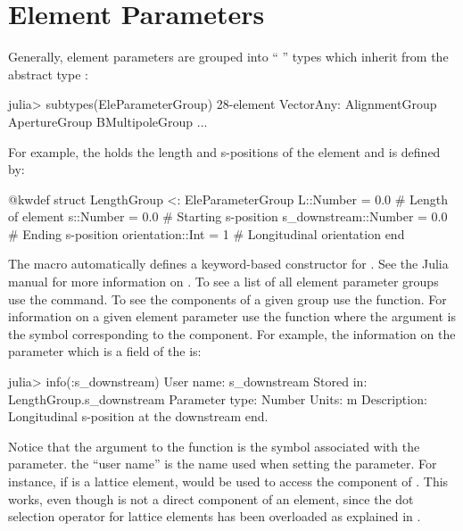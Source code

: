 \section{Element Parameters}
\label{s:ele.type}

Generally, element parameters are grouped into ``  '' 
types which inherit from the abstract type :
\begin{example}
  julia> subtypes(EleParameterGroup)
  28-element Vector{Any}:
   AlignmentGroup
   ApertureGroup
   BMultipoleGroup
   ...
\end{example}

For example, the  holds the length and s-positions of the element and is defined by:
\begin{example}
  @kwdef struct LengthGroup <: EleParameterGroup
    L::Number = 0.0               # Length of element
    s::Number = 0.0               # Starting s-position
    s_downstream::Number = 0.0    # Ending s-position
    orientation::Int = 1          # Longitudinal orientation
  end
\end{example}
The  macro automatically defines a keyword-based constructor for .
See the Julia manual for more information on . 
To see a list of all element parameter groups use the  command.
To see the components of a given group use the  function. For information on
a given element parameter use the  function where the argument is the
symbol corresponding to the component. For example, the information on
the  parameter which is a field of the  is:
\begin{example}
  julia> info(:s_downstream)
    User name:       s_downstream
    Stored in:       LengthGroup.s_downstream
    Parameter type:  Number
    Units:           m
    Description:     Longitudinal s-position at the downstream end.
\end{example}
Notice that the argument to the  function is the symbol associated with the parameter.
the ``user name'' is the name used when setting the parameter. For instance, if  is a
lattice element,  would be used to access the  component of .
This works, even though  is not a direct component of an element, since the dot
selection operator for lattice elements has been overloaded as explained in .
